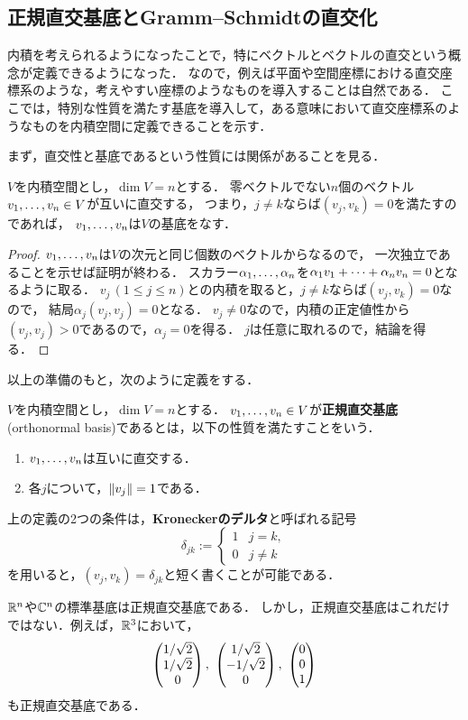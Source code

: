 \subsection{正規直交基底とGramm--Schmidtの直交化}
内積を考えられるようになったことで，特にベクトルとベクトルの直交という概念が定義できるようになった．
なので，例えば平面や空間座標における直交座標系のような，考えやすい座標のようなものを導入することは自然である．
ここでは，特別な性質を満たす基底を導入して，ある意味において直交座標系のようなものを内積空間に定義できることを示す．

まず，直交性と基底であるという性質には関係があることを見る．
\begin{prop}
$V$を内積空間とし，$\dim V = n$とする．
零ベクトルでない$n$個のベクトル$\idxdot{v}{1}{n} \in V$が互いに直交する，
つまり，$j \neq k$ならば$(v_j,v_k) = 0$を満たすのであれば，
$\idxdot{v}{1}{n}$は$V$の基底をなす．
\end{prop}
\begin{proof}
$\idxdot{v}{1}{n}$は$V$の次元と同じ個数のベクトルからなるので，
一次独立であることを示せば証明が終わる．
スカラー$\idxdot{\alpha}{1}{n}$を$\lncmb{\alpha}{v}{1}{n}{+}=0$となるように取る．
$v_j\,(1 \le j \le n)$との内積を取ると，$j \neq k$ならば$(v_j,v_k)=0$なので，
結局$\alpha_j(v_j,v_j) = 0$となる．
$v_j \neq 0$なので，内積の正定値性から$(v_j,v_j) > 0$であるので，$\alpha_j = 0$を得る．
$j$は任意に取れるので，結論を得る．
\end{proof}
以上の準備のもと，次のように定義をする．
\begin{dfn}
$V$を内積空間とし，$\dim V = n$とする．
$\idxdot{v}{1}{n} \in V$が\textbf{正規直交基底}(orthonormal basis)であるとは，以下の性質を満たすことをいう．
\begin{enumerate}
  \item $\idxdot{v}{1}{n}$は互いに直交する．
  \item 各$j$について，$\norm{v_j}=1$である．
\end{enumerate}
\end{dfn}
上の定義の2つの条件は，\textbf{Kroneckerのデルタ}と呼ばれる記号
\[
  \delta_{jk} := \left\{
    \begin{array}{ll}
      1 & j = k, \\
      0 & j \neq k
    \end{array}  
  \right.  
\]
を用いると，$(v_j,v_k)=\delta_{jk}$と短く書くことが可能である．
\begin{example}
  $\RR^n$や$\CC^n$の標準基底は正規直交基底である．
  しかし，正規直交基底はこれだけではない．例えば，$\RR^3$において，
  \[
    \pmt{1/\sqrt{2} \\ 1/\sqrt{2} \\ 0},\ 
    \pmt{1/\sqrt{2} \\ -1/\sqrt{2} \\ 0},\ 
    \pmt{0 \\ 0 \\ 1}  
  \]
  も正規直交基底である．
\end{example}
